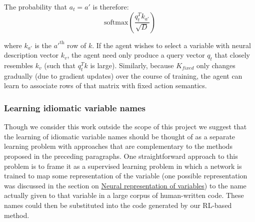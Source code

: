 \documentclass{article}
\begin{document}
The probability that $a_t = a'$ is therefore:
\begin{equation}
    \textrm{softmax}(\frac{q_t^Tk_{a'}}{\sqrt{D}})
\end{equation}

where $k_{a'}$ is the $a'^{\textrm{th}}$ row of $k$. If the agent wishes to select a variable with neural description vector $k_v$, the agent need only produce a query vector $q_t$ that closely resembles $k_v$ (such that $q_t^Tk$ is large). Similarly, because $K_{fixed}$ only changes gradually (due to gradient updates) over the course of training, the agent can learn to associate rows of that matrix with fixed action semantics.

\subsubsection{Learning idiomatic variable names}
\hspace{16}Though we consider this work outside the scope of this project we suggest that the learning of idiomatic variable names should be thought of as a separate learning problem with approaches that are complementary to the methods proposed in the preceding paragraphs. One straightforward approach to this problem is to frame it as a supervised learning problem in which a network is trained to map some representation of the variable (one possible representation was discussed in the section on \hyperref[sec:neural-representation]{Neural representation of variables}) to the name actually given to that variable in a large corpus of human-written code. These names could then be substituted into the code generated by our RL-based method.
\end{document}
